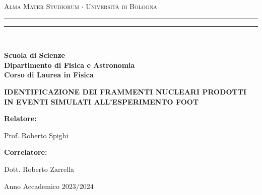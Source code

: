 \documentclass[12pt,a4paper,twoside]{report}
\newenvironment{dedication}{
	\clearpage           %
	\thispagestyle{empty}%
	\vspace*{\stretch{1}}%
	\itshape             %
	\raggedleft          %
}
{\par %
	\vspace{\stretch{3}} %
	\clearpage           %
}
\begin{document}
	\begin{titlepage}
		\begin{center}
			{{\Large{\textsc{Alma Mater Studiorum $\cdot$ Universit\`a di Bologna}}}} 
			\rule[0.1cm]{15.8cm}{0.1mm}
			\rule[0.5cm]{15.8cm}{0.6mm}
			\\\vspace{3mm}
			
			{\small{\bf Scuola di Scienze\\ 
					Dipartimento di Fisica e Astronomia\\
					Corso di Laurea in Fisica}}
			
		\end{center}
		
		\vspace{23mm}
		
		\begin{center}
			\doublespacing
			{\LARGE{\bf IDENTIFICAZIONE DEI FRAMMENTI NUCLEARI PRODOTTI IN EVENTI SIMULATI ALL'ESPERIMENTO FOOT}}\\
		\end{center}
		
		\vspace{35mm} \par \noindent
		
		\begin{minipage}[t]{0.47\textwidth}
			{\large{\bf Relatore: \vspace{3mm}
					
					Prof. Roberto Spighi}}
		\end{minipage}
		\hfill
		\begin{minipage}[t]{0.47\textwidth}
		\end{minipage}
		
		\par
		\vspace{\baselineskip}
		
		\begin{minipage}[t]{0.47\textwidth}
			{\large{\bf Correlatore: \vspace{3mm}
					
					Dott. Roberto Zarrella}}
		\end{minipage}
		
		\vspace{45mm}
		
		\begin{center}
			Anno Accademico {$2023/2024$}
		\end{center}
		
	\end{titlepage}
	\newpage
	\onehalfspacing %
\end{document}
